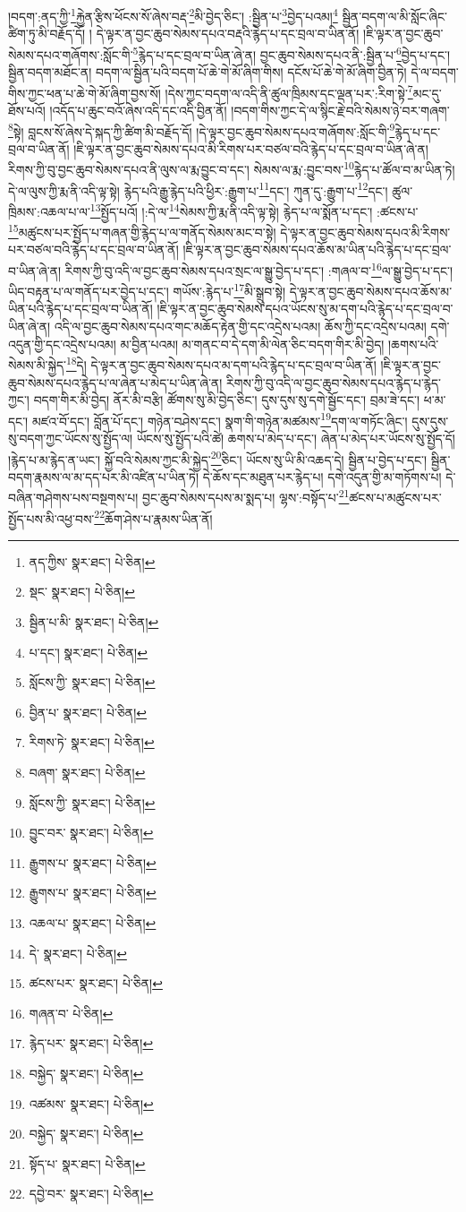 །བདག་:ནད་ཀྱི་\footnote{ནད་ཀྱིས་  སྣར་ཐང་།  པེ་ཅིན། }རྐྱེན་རྩིས་ཕོངས་སོ་ཞེས་བརྡ་\footnote{སྡང་  སྣར་ཐང་།  པེ་ཅིན། }མི་བྱེད་ཅིང་། :སྦྱིན་པ་\footnote{སྦྱིན་པ་མི་  སྣར་ཐང་།  པེ་ཅིན། }བྱེད་པའམ།\footnote{པ་དང་།  སྣར་ཐང་།  པེ་ཅིན། } སྦྱིན་བདག་ལ་མི་སློང་ཞིང་ཚིག་ཏུ་མི་བརྗོད་དོ། །
དེ་ལྟར་ན་བྱང་ཆུབ་སེམས་དཔའ་བརྡའི་རྙེད་པ་དང་བྲལ་བ་ཡིན་ནོ། །ཇི་ལྟར་ན་བྱང་ཆུབ་སེམས་དཔའ་གཞོགས་:སློང་གི་\footnote{སློངས་ཀྱི་  སྣར་ཐང་།  པེ་ཅིན། }རྙེད་པ་དང་བྲལ་བ་ཡིན་ཞེ་ན། བྱང་ཆུབ་སེམས་དཔའ་ནི་:སྦྱིན་པ་\footnote{བྱིན་པ་  སྣར་ཐང་།  པེ་ཅིན། }བྱེད་པ་དང་། སྦྱིན་བདག་མཐོང་ན། བདག་ལ་སྦྱིན་པའི་བདག་པོ་ཆེ་གེ་མོ་ཞིག་གིས། དངོས་པོ་ཆེ་གེ་མོ་ཞིག་བྱིན་ཏེ། དེ་ལ་བདག་གིས་ཀྱང་ཕན་པ་ཆེ་གེ་མོ་ཞིག་བྱས་སོ། །དེས་ཀྱང་བདག་ལ་འདི་ནི་ཚུལ་ཁྲིམས་དང་ལྡན་པར་:རིག་སྟེ་\footnote{རིགས་ཏེ་  སྣར་ཐང་།  པེ་ཅིན། }མང་དུ་ཐོས་པའོ། །འདོད་པ་ཆུང་བའོ་ཞེས་འདི་དང་འདི་བྱིན་ནོ། །བདག་གིས་ཀྱང་དེ་ལ་སྙིང་རྗེ་བའི་སེམས་ཉེ་བར་གཞག་\footnote{བཞག་  སྣར་ཐང་།  པེ་ཅིན། }སྟེ། བླངས་སོ་ཞེས་དེ་སྐད་ཀྱི་ཚིག་མི་བརྗོད་དོ། །དེ་ལྟར་བྱང་ཆུབ་སེམས་དཔའ་གཞོགས་:སློང་གི་\footnote{སློངས་ཀྱི་  སྣར་ཐང་།  པེ་ཅིན། }རྙེད་པ་དང་བྲལ་བ་ཡིན་ནོ། །ཇི་ལྟར་ན་བྱང་ཆུབ་སེམས་དཔའ་མི་རིགས་པར་བཙལ་བའི་རྙེད་པ་དང་བྲལ་བ་ཡིན་ཞེ་ན། རིགས་ཀྱི་བུ་བྱང་ཆུབ་སེམས་དཔའ་ནི་ལུས་ལ་རྨ་བྱུང་བ་དང་། སེམས་ལ་རྨ་:བྱུང་བས་\footnote{བྱུང་བར་  སྣར་ཐང་།  པེ་ཅིན། }རྙེད་པ་ཚོལ་བ་མ་ཡིན་ཏེ། དེ་ལ་ལུས་ཀྱི་རྨ་ནི་འདི་ལྟ་སྟེ། རྙེད་པའི་རྒྱུ་རྙེད་པའི་ཕྱིར་:རྒྱུག་པ་\footnote{རྒྱུགས་པ་  སྣར་ཐང་།  པེ་ཅིན། }དང་། ཀུན་དུ་:རྒྱུག་པ་\footnote{རྒྱུགས་པ་  སྣར་ཐང་།  པེ་ཅིན། }དང་། ཚུལ་ཁྲིམས་:འཆལ་པ་ལ་\footnote{འཆལ་པ་  སྣར་ཐང་།  པེ་ཅིན། }སྤྱོད་པའོ། །:དེ་ལ་\footnote{དེ་  སྣར་ཐང་།  པེ་ཅིན། }སེམས་ཀྱི་རྨ་ནི་འདི་ལྟ་སྟེ། རྙེད་པ་ལ་སྨོན་པ་དང་། :ཚངས་པ་\footnote{ཚངས་པར་  སྣར་ཐང་།  པེ་ཅིན། }མཚུངས་པར་སྤྱོད་པ་གཞན་གྱི་རྙེད་པ་ལ་གནོད་སེམས་མང་བ་སྟེ། དེ་ལྟར་ན་བྱང་ཆུབ་སེམས་དཔའ་མི་རིགས་པར་བཙལ་བའི་རྙེད་པ་དང་བྲལ་བ་ཡིན་ནོ། །ཇི་ལྟར་ན་བྱང་ཆུབ་སེམས་དཔའ་ཆོས་མ་ཡིན་པའི་རྙེད་པ་དང་བྲལ་བ་ཡིན་ཞེ་ན། རིགས་ཀྱི་བུ་འདི་ལ་བྱང་ཆུབ་སེམས་དཔའ་སྲང་ལ་སྒྱུ་བྱེད་པ་དང་། :གཞལ་བ་\footnote{གཞན་བ་  པེ་ཅིན། }ལ་སྒྱུ་བྱེད་པ་དང་། ཡིད་བརྟན་པ་ལ་གནོད་པར་བྱེད་པ་དང་། གཡོས་:རྙེད་པ་\footnote{རྙེད་པར་  སྣར་ཐང་།  པེ་ཅིན། }མི་སྒྲུབ་སྟེ། དེ་ལྟར་ན་བྱང་ཆུབ་སེམས་དཔའ་ཆོས་མ་ཡིན་པའི་རྙེད་པ་དང་བྲལ་བ་ཡིན་ནོ། །ཇི་ལྟར་ན་བྱང་ཆུབ་སེམས་དཔའ་ཡོངས་སུ་མ་དག་པའི་རྙེད་པ་དང་བྲལ་བ་ཡིན་ཞེ་ན། འདི་ལ་བྱང་ཆུབ་སེམས་དཔའ་གང་མཆོད་རྟེན་གྱི་དང་འདྲེས་པའམ། ཆོས་ཀྱི་དང་འདྲེས་པའམ། དགེ་འདུན་གྱི་དང་འདྲེས་པའམ། མ་བྱིན་པའམ། མ་གནང་བ་དེ་དག་མི་ལེན་ཅིང་བདག་གིར་མི་བྱེད། །ཆགས་པའི་སེམས་མི་སྐྱེད་\footnote{བསྐྱེད་  སྣར་ཐང་།  པེ་ཅིན། }དེ། དེ་ལྟར་ན་བྱང་ཆུབ་སེམས་དཔའ་མ་དག་པའི་རྙེད་པ་དང་བྲལ་བ་ཡིན་ནོ། །ཇི་ལྟར་ན་བྱང་ཆུབ་སེམས་དཔའ་རྙེད་པ་ལ་ཞེན་པ་མེད་པ་ཡིན་ཞེ་ན། རིགས་ཀྱི་བུ་འདི་ལ་བྱང་ཆུབ་སེམས་དཔའ་རྙེད་པ་རྙེད་ཀྱང་། བདག་གིར་མི་བྱེད། ནོར་མི་བརྩི། ཚོགས་སུ་མི་བྱེད་ཅིང་། དུས་དུས་སུ་དགེ་སྦྱོང་དང་། བྲམ་ཟེ་དང་། ཕ་མ་དང་། མཛའ་བོ་དང་། བློན་པོ་དང་། གཉེན་བཤེས་དང་། སྣག་གི་གཉེན་མཚམས་\footnote{འཚམས་  སྣར་ཐང་།  པེ་ཅིན། }དག་ལ་གཏོང་ཞིང་། དུས་དུས་སུ་བདག་ཀྱང་ཡོངས་སུ་སྤྱོད་ལ། ཡོངས་སུ་སྤྱོད་པའི་ཚེ། ཆགས་པ་མེད་པ་དང་། ཞེན་པ་མེད་པར་ཡོངས་སུ་སྤྱོད་དོ། །རྙེད་པ་མ་རྙེད་ན་ཡང་། སྐྱོ་བའི་སེམས་ཀྱང་མི་སྐྱེད་\footnote{བསྐྱེད་  སྣར་ཐང་།  པེ་ཅིན། }ཅིང་། ཡོངས་སུ་ཡི་མི་འཆད་དེ། སྦྱིན་པ་བྱེད་པ་དང་། སྦྱིན་བདག་རྣམས་ལ་མ་དད་པར་མི་འཛིན་པ་ཡིན་ཏེ། དེ་ཆོས་དང་མཐུན་པར་རྙེད་པ། དགེ་འདུན་གྱི་མ་གཏོགས་པ། དེ་བཞིན་གཤེགས་པས་བསྔགས་པ། བྱང་ཆུབ་སེམས་དཔས་མ་སྨད་པ། ལྷས་:བསྟོད་པ་\footnote{སྟོད་པ་  སྣར་ཐང་།  པེ་ཅིན། }ཚངས་པ་མཚུངས་པར་སྤྱོད་པས་མི་འཕྱ་བས་\footnote{དབྱེ་བར་  སྣར་ཐང་།  པེ་ཅིན། }ཆོག་ཤེས་པ་རྣམས་ཡིན་ནོ། 